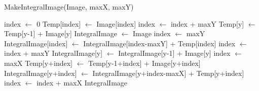 \documentclass[11pt]{article}
\begin{document}
\begin{algorithm}[*h]
\caption{MakeIntegralImage(Image, maxX, maxY)} 
\begin{algorithmic}
		\STATE index $\leftarrow$ 0
			\STATE Temp[index] $\leftarrow$ Image[index]
			\STATE index $\leftarrow$ index + maxY
		\ENDFOR
			\STATE Temp[y] $\leftarrow$ Temp[y-1] + Image[y]
		\ENDFOR
		\STATE IntegralImage $\leftarrow$ Image
		\STATE index $\leftarrow$ maxY
			\STATE IntegralImage[index] $\leftarrow$ IntegralImage[index-maxY] + Temp[index]
			\STATE index $\leftarrow$ index + maxY
		\ENDFOR
			\STATE IntegralImage[y] $\leftarrow$ IntegralImage[y-1] + Image[y]
		\ENDFOR
		\STATE index $\leftarrow$ maxX
				\STATE Temp[y+index] $\leftarrow$ Temp[y-1+index] + Image[y+index]
				\STATE IntegralImage[y+index] $\leftarrow$ IntegralImage[y+index-maxX] + Temp[y+index]
			\ENDFOR
			\STATE index $\leftarrow$ index + maxX
		\ENDFOR
		\RETURN IntegralImage
\end{algorithmic} 
\end{algorithm}
\end{document}
